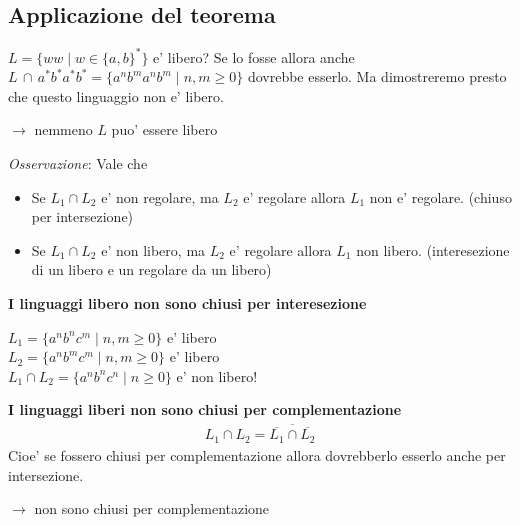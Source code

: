 \documentclass[a4paper,12pt]{article}
\begin{document}
{\subsection{Applicazione del teorema}
$L = \{ww \mid w\in\{a,b\}^*\}$ e' libero? Se lo fosse allora anche $L \, \cap \,  a^* b^* a^* b^* = \{a^n b^m a^n b^m \mid n,m \geq 0 \}$ dovrebbe esserlo. Ma dimostreremo presto che questo linguaggio non e' libero.
\begin{center}
  $\to$ nemmeno $L$ puo' essere libero
\end{center}
\textit{Osservazione}: Vale che
\begin{itemize}
  \item Se $L_1 \cap L_2$ e' non regolare, ma $L_2$ e' regolare allora $L_1$ non e' regolare. (chiuso per intersezione)
  \item Se $L_1 \cap L_2$ e' non libero, ma $L_2$ e' regolare allora $L_1$  non libero. (interesezione di un libero e un regolare da un libero)
\end{itemize}
\vspace{1em} 
\textbf{I linguaggi libero non sono chiusi per interesezione}
\begin{center}
  $L_1 = \{a^n b^n c^m \mid n,m \geq 0\}$ e' libero \\
  $L_2 = \{a^n b^m c^m \mid n,m \geq 0\}$ e' libero \\
  $L_1 \cap L_2 = \{a^n b^n c^n \mid n \geq 0\}$ e' non libero!
\end{center}
\vspace{1em}
\textbf{I linguaggi liberi non sono chiusi per complementazione}
\begin{align*}
  L_1 \cap L_2 = \overline{\overline{L_1} \cap \overline{L_2}}
\end{align*}
Cioe' se fossero chiusi per complementazione allora dovrebberlo esserlo anche per intersezione.
\begin{center}
   $\to$ non sono chiusi per complementazione
\end{center}
}
\end{document}
